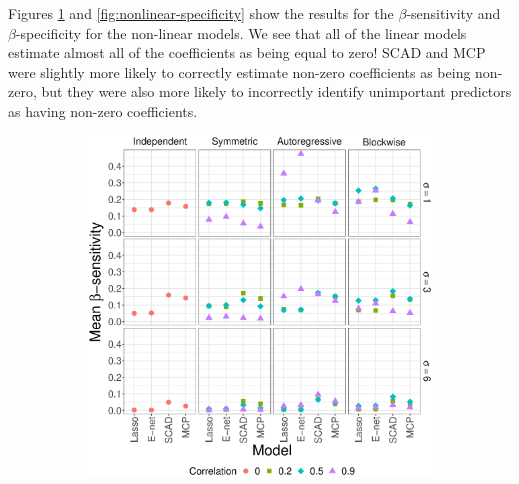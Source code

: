 \documentclass{article}
\begin{document}
	Figures \ref{fig:nonlinear-sensitivity} and \ref{fig:nonlinear-specificity} show the results for the $\beta$-sensitivity and $\beta$-specificity for the non-linear models. We see that all of the linear models estimate almost all of the coefficients as being equal to zero! SCAD and MCP were slightly more likely to correctly estimate non-zero coefficients as being non-zero, but they were also more likely to incorrectly identify unimportant predictors as having non-zero coefficients.
	\begin{figure}[!htb]
		\centering
		\begin{subfigure}[b]{0.47\textwidth}
			\includegraphics[width=\textwidth]{images/facet/publication_facet_sensitivity_nonlinear_50_2000.eps}
			\label{fig:nonlinear-sensitivity}
		\end{subfigure}
		\hspace{6pt}
		\begin{subfigure}[b]{0.47\textwidth}

\end{subfigure}
\end{figure}
\end{document}
